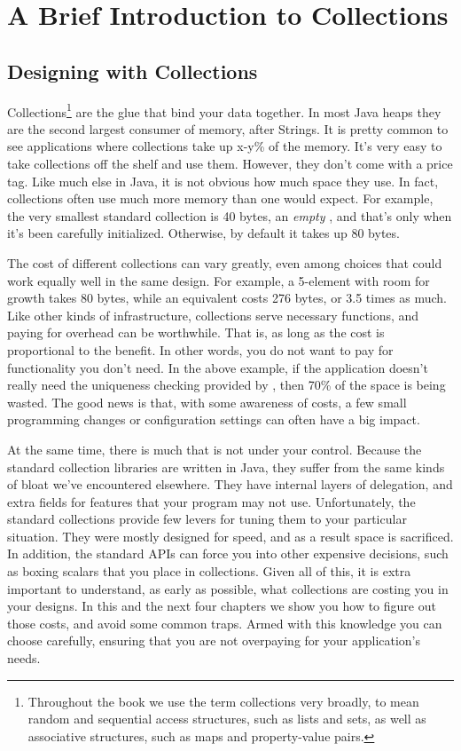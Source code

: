 \chapter{A Brief Introduction to Collections}
\section{Designing with Collections}
Collections\footnote{Throughout the book we use the term collections
very broadly, to mean random and sequential access structures, such as lists and
sets, as well as associative structures, such as maps and property-value
pairs.} are the glue that bind your data together. In most Java heaps they are the second largest consumer of memory,
after Strings. It is pretty common to see applications where collections take up x-y\% of
the memory. It's very easy to take collections off the shelf
and use them. However, they don't come with a price tag. Like much else in Java,
it is not obvious how much space they use. In fact,
collections often use much more memory than one would expect. For example,
the very smallest standard collection is 40 bytes, an \emph{empty}
, and that's only when it's been carefully initialized. 
Otherwise, by default it takes up 80 bytes. 

The cost of
different collections can vary greatly, even among choices that could work
equally well in the same design. For example, a 5-element  with
room for growth takes 80 bytes, while an equivalent  costs 276 bytes, or 3.5 times as much. 
Like other kinds of infrastructure, collections serve necessary
functions, and paying for overhead can be worthwhile.  That is, as long as
the cost is proportional to the benefit. In other words, you do not want to pay
for functionality you don't need. In the above example, if
the application doesn't really need the uniqueness checking provided by
, then 70\% of the space is being wasted.  The good news is that,
with some awareness of costs, a few small programming changes or configuration
settings can often have a big impact.

At the same time, there is much that is not under your control.
Because the standard collection libraries are written in Java, they suffer from
the same kinds of bloat we've encountered elsewhere. They have internal layers
of delegation, and extra fields for features that your program may not
use. Unfortunately, the standard collections provide few levers for
tuning them to your particular situation. They were
mostly designed for speed, and as a result space is sacrificed. In addition, the
standard APIs can force you into other expensive decisions, such as boxing
scalars that you place in collections. Given all of this, it is extra important
to understand, as early as possible, what collections are costing you in your
designs. In this and the next four chapters we show
you how to figure out those costs, and avoid some common traps. 
Armed with this
knowledge you can choose carefully, ensuring that you are not
overpaying for your application's needs.

